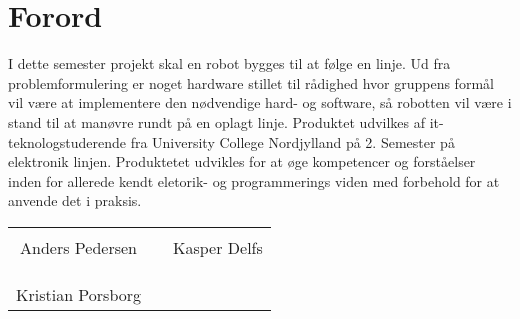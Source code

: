 \chapter*{Forord}

I dette semester projekt skal en robot bygges til at følge en linje. Ud fra problemformulering er noget hardware stillet til rådighed hvor gruppens formål vil være at implementere den nødvendige hard- og software, så 
robotten vil være i stand til at manøvre rundt på en oplagt linje. Produktet udvilkes af it-teknologstuderende fra University College Nordjylland på 2. Semester på elektronik linjen. 
Produktetet udvikles for at øge kompetencer og forståelser inden for allerede kendt eletorik- og programmerings viden med forbehold for at anvende det i praksis.





%
\phantom{Luft}\vspace{3cm}
\begin{table}[H]
	\centering
		\begin{tabular}{c c c}
			\underline{\phantom{JAERJAERJAERJAERGO}} & \phantom{cookies} & \underline{\phantom{JAERJAERJAERJAERGO}} \\
			Anders Pedersen			& \phantom{cookies} & Kasper Delfs		\\
			&&\\
			&&\\
			 \underline{\phantom{JAERJAERJAERJAERGO}} \\
			Kristian Porsborg			
			&&\\
					
		\end{tabular}
\end{table}